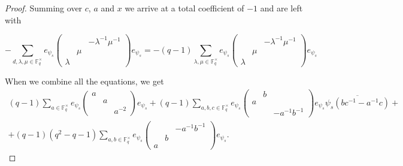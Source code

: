 \documentclass[12pt,reqno]{amsart}
\theoremstyle{definition}
\theoremstyle{remark}
\numberwithin{equation}{section}
\begin{document}
\begin{proof}
    Summing over $c$, $a$ and $x$ we arrive at a total coefficient of $-1$ and are left with

    \begin{equation*}
        -\sum_{ d, \lambda, \mu
        \in \mathbb{F}_q^\times}e_{\psi_s}\begin{pmatrix}
            & & -\lambda^{-1}\mu^{-1}\\
            & \mu &\\
            \lambda & &
        \end{pmatrix} e_{\psi_s} = -(q-1) \sum_{\lambda, \mu \in \mathbb{F}_q^\times} e_{\psi_s}\begin{pmatrix}
            & & -\lambda^{-1}\mu^{-1}\\
            & \mu &\\
            \lambda & &
        \end{pmatrix} e_{\psi_s}
    \end{equation*}

    When we combine all the equations, we get
    \begin{align*}
        (q-1)\sum_{a \in \mathbb{F}_q^\times} e_{\psi_s} \begin{pmatrix}
            a & & \\
            & a & \\
            & & a^{-2}
        \end{pmatrix}e_{\psi_s} + (q-1) \sum_{a, b, c \in \mathbb{F}_q^\times} e_{\psi_s}\begin{pmatrix}
            & b &\\
            a & &\\
            & & -a^{-1}b^{-1}
        \end{pmatrix}e_{\psi_s}\overline{\psi_s(bc^{-1}-a^{-1}c)}+\\+(q-1)(q^2-q-1) \sum_{a, b \in \mathbb{F}_q^\times} e_{\psi_s} \begin{pmatrix}
            & & -a^{-1}b^{-1} \\
            & b &\\
            a & &
        \end{pmatrix} e_{\psi_s}.
    \end{align*}
\end{proof}
\end{document}

